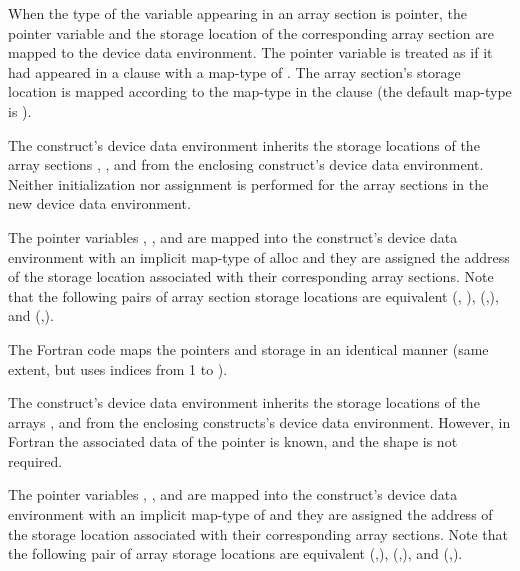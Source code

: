 When the type of the variable appearing in an array section is pointer, the pointer 
variable and the storage location of the corresponding array section are mapped 
to the device data environment. The pointer variable is treated as if it had appeared 
in a  clause with a map-type of . The array section's 
storage location is mapped according to the map-type in the  clause 
(the default map-type is ).

The  construct's device data environment inherits the storage locations 
of the array sections , , and  from the enclosing 
construct's device data environment. Neither initialization nor assignment is performed 
for the array sections in the new device data environment.

The pointer variables , , and  are mapped into the  construct's device 
data environment with an implicit map-type of alloc and they are assigned the address 
of the storage location associated with their corresponding array sections. Note 
that the following pairs of array section storage locations are equivalent (, 
), (,), and (,).


The Fortran code maps the pointers and storage in an identical manner (same extent, 
but uses indices from 1 to ).

The  construct's device data environment inherits the storage locations 
of the arrays ,  and  from the enclosing  constructs's 
device data environment. However, in Fortran the associated data of the pointer 
is known, and the shape is not required.

The pointer variables , , and  are mapped into the  construct's 
device data environment with an implicit map-type of  and they are 
assigned the address of the storage location associated with their corresponding 
array sections. Note that the following pair of array storage locations are equivalent 
(,), (,), and (,).



